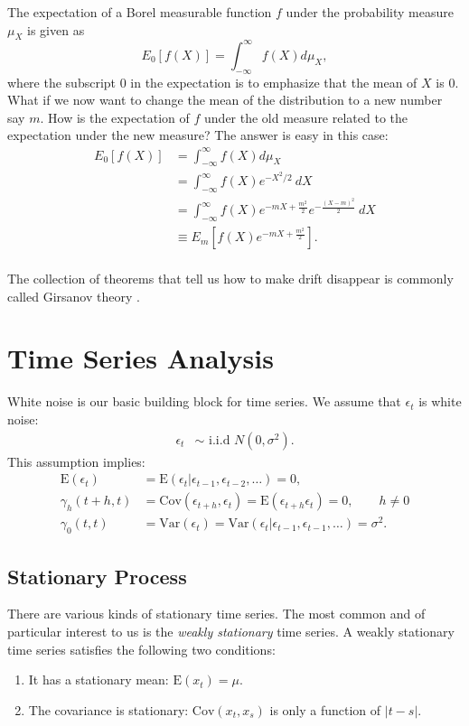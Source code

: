 \documentclass{amsart}
\theoremstyle{plain}
\numberwithin{equation}{section}
\begin{document}
The expectation of a Borel measurable function 
$f$ under the probability measure 
$\mu_X$ is given as
\begin{equation*}
E_0[f(X)] = \int_{-\infty}^{\infty} f(X) d\mu_X,
\end{equation*}
where the subscript $0$ in the expectation is to 
emphasize that the mean of $X$ is $0$. What if
we now want to change the mean of the distribution
to a new number say $m$. How is the expectation of
$f$ under the old measure related to the 
expectation under the new measure?
The answer is easy in this case:
\begin{align*}
E_0[f(X)] &= \int_{-\infty}^{\infty} f(X) d\mu_X \\
					&= \int_{-\infty}^{\infty} f(X) e^{-X^2/2} \: dX \\
					&= \int_{-\infty}^{\infty} f(X) e^{-mX + \frac{m^2}{2}}e^{-\frac{(X-m)^2}{2}} \: dX \\
					&\equiv E_m\left[f(X)e^{-mX + \frac{m^2}{2}}\right].\\
\end{align*}


The collection of theorems that tell us how to make 
drift disappear is commonly called Girsanov theory
\cite[Ch.\ 13]{steele2001stochastic}.

\section{Time Series Analysis}
White noise is our basic building block
for time series. We assume that $\epsilon_t$ is white noise:
\begin{align*}
\epsilon_t &\sim \textrm{ i.i.d } N(0, \sigma^2).
\end{align*}
This assumption implies:
\begin{align*}
\mathrm{E}(\epsilon_t) 
&= \mathrm{E}(\epsilon_t | \epsilon_{t-1}, \epsilon_{t-2}, \ldots) = 0,\\
\gamma_{h}(t+h, t) &= \mathrm{Cov}(\epsilon_{t+h}, \epsilon_t) 
= \mathrm{E}(\epsilon_{t+h} \epsilon_t) = 0, \qquad h \neq 0\\
\gamma_{0}(t, t) &= \mathrm{Var}(\epsilon_t) 
= \mathrm{Var}(\epsilon_t| \epsilon_{t-1}, \epsilon_{t-1}, \ldots) 
= \sigma^2.
\end{align*}

\subsection*{Stationary Process}
There are various kinds of stationary time series. The most 
common and of particular interest to us is the 
\emph{weakly stationary} time series. 
A weakly stationary time series satisfies
the following two conditions: 
\begin{enumerate}
\item It has a stationary mean: $\mathrm{E}(x_t) = \mu$.
\item The covariance is stationary: $\mathrm{Cov}(x_t, x_s)$ is only a function 
of $|t-s|$.
\end{enumerate}
\end{document}
